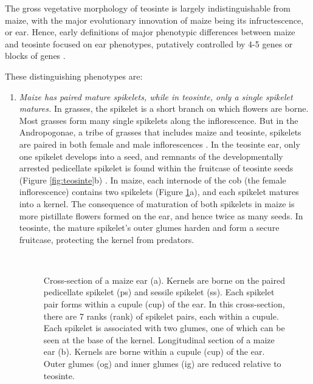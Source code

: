 \documentclass[9pt,twocolumn,twoside]{rilabRxiv}
\begin{document}
﻿The gross vegetative morphology of teosinte is largely indistinguishable from maize, with the major evolutionary innovation of maize being its infructescence, or ear.
Hence, early definitions of major phenotypic differences between maize and teosinte focused on ear phenotypes, putatively controlled by 4-5 genes or blocks of genes \citep{beadle1939, mangelsdorf1939}.

\noindent These distinguishing phenotypes are:

\begin{enumerate}

﻿ \item \textit{Maize has paired mature spikelets, while in teosinte, only a single spikelet matures.}
 In grasses, the spikelet is a short branch on which flowers are borne.
 Most grasses form many single spikelets along the inflorescence.
 But in the Andropogonae, a tribe of grasses that includes maize and teosinte, spikelets are paired in both female and male inflorescences \citep{kellogg2000, wu2009}.
﻿In the teosinte ear, only one spikelet develops into a seed, and remnants of the developmentally arrested pedicellate spikelet is found within the fruitcase of teosinte seeds (Figure \ref{fig:teosinte}b) \citep{weatherwax1935, sundberg1990, doebley1995sos1}.
 In maize, each internode of the cob (the female inflorescence) contains two spikelets (Figure \ref{fig:maize}a), and each spikelet matures into a kernel.
 The consequence of maturation of both spikelets in maize is more pistillate flowers formed on the ear, and hence twice as many seeds.
 In teosinte, the mature spikelet's outer glumes harden and form a secure fruitcase, protecting the  kernel from predators.

﻿   \begin{figure}
        \caption{\label{fig:maize} Cross-section of a maize ear (a). Kernels are borne on the paired pedicellate spikelet (ps) and sessile spikelet (ss). Each spikelet pair forms within a cupule (cup) of the ear. In this cross-section, there are 7 ranks (rank) of spikelet pairs, each within a cupule. Each spikelet is associated with two glumes, one of which can be seen at the base of the kernel.
        ﻿Longitudinal section of a maize ear (b). Kernels are borne within a cupule (cup) of the ear. Outer glumes (og) and inner glumes (ig) are reduced relative to teosinte.}
      \end{figure}



\end{enumerate}
\end{document}
